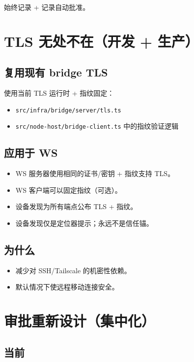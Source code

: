 始终记录 + 记录自动批准。

\hrulefill


\section{TLS 无处不在（开发 + 生产）}


\subsection{复用现有 bridge TLS}


使用当前 TLS 运行时 + 指纹固定：

\begin{itemize}
  \item \texttt{src/infra/bridge/server/tls.ts}
  \item \texttt{src/node-host/bridge-client.ts} 中的指纹验证逻辑
\end{itemize}


\subsection{应用于 WS}


\begin{itemize}
  \item WS 服务器使用相同的证书/密钥 + 指纹支持 TLS。
  \item WS 客户端可以固定指纹（可选）。
  \item 设备发现为所有端点公布 TLS + 指纹。
  \item 设备发现仅是定位器提示；永远不是信任锚。
\end{itemize}


\subsection{为什么}


\begin{itemize}
  \item 减少对 SSH/Tailscale 的机密性依赖。
  \item 默认情况下使远程移动连接安全。
\end{itemize}


\hrulefill


\section{审批重新设计（集中化）}


\subsection{当前}


